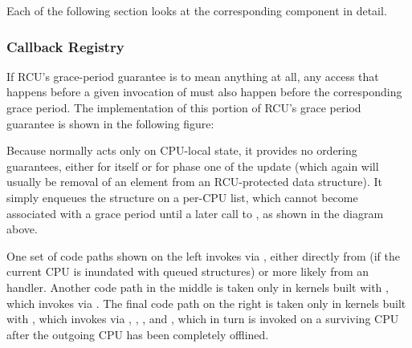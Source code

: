 Each of the following section looks at the corresponding component in
detail.

\subsubsection{Callback Registry}
\label{sec:rcu:memorder:Callback Registry}

If RCU's grace-period guarantee is to mean anything at all, any access
that happens before a given invocation of  must also
happen before the corresponding grace period.
The implementation of this
portion of RCU's grace period guarantee is shown in the following
figure:

\begin{center}
\end{center}

Because  normally acts only on CPU-local state, it
provides no ordering guarantees, either for itself or for phase one of
the update (which again will usually be removal of an element from an
RCU-protected data structure).
It simply enqueues the 
structure on a per-CPU list, which cannot become associated with a grace
period until a later call to , as shown in the
diagram above.

One set of code paths shown on the left invokes 
via , either directly from  (if the
current CPU is inundated with queued  structures) or more
likely from an  handler.
Another code path in the middle
is taken only in kernels built with , which
invokes  via .
The
final code path on the right is taken only in kernels built with
, which invokes  via
, ,
, and , which in turn
is invoked on a surviving CPU after the outgoing CPU has been completely
offlined.

